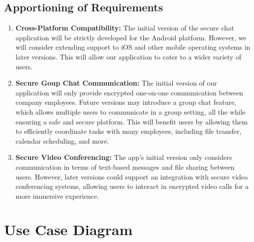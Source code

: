 \documentclass[]{article}
\begin{document}
\subsection{Apportioning of Requirements}
\label{sub:apportioning_of_requirements}
\begin{enumerate}
	\item \textbf{Cross-Platform Compatibility: }The initial version of the secure chat application will be strictly developed for the Android platform. However, we will consider extending support to iOS and other mobile operating systems in later versions. This will allow our application to cater to a wider variety of users.
	\item \textbf{Secure Goup Chat Communication: }The initial version of our application will only provide encrypted one-on-one communication between company employees. Future versions may introduce a group chat feature, which allows multiple users to communicate in a group setting, all the while ensuring a safe and secure platform. This will benefit users by allowing them to efficiently coordinate tasks with many employees, including file transfer, calendar scheduling, and more.
	\item \textbf{Secure Video Conferencing: }The app’s initial version only considers communication in terms of text-based messages and file sharing between users. However, later versions could support an integration with secure video conferencing systems, allowing users to interact in encrypted video calls for a more immersive experience.

\end{enumerate}

\newpage
\section{Use Case Diagram}
\label{sec:use_case_diagram}
\end{document}
